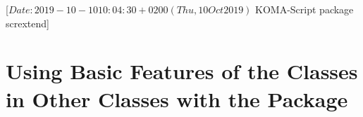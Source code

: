 %
%
%
%
%
%
%
%
% 
%
%
%
%

                 [$Date: 2019-10-10 10:04:30 +0200 (Thu, 10 Oct 2019) $
                  KOMA-Script package scrextend]


\chapter[{\KOMAScript{} Features for Other Classes with \Package{scrextend}}]
  {Using Basic Features of the \KOMAScript{} Classes in Other Classes with the
     Package}
\BeginIndexGroup%
%

